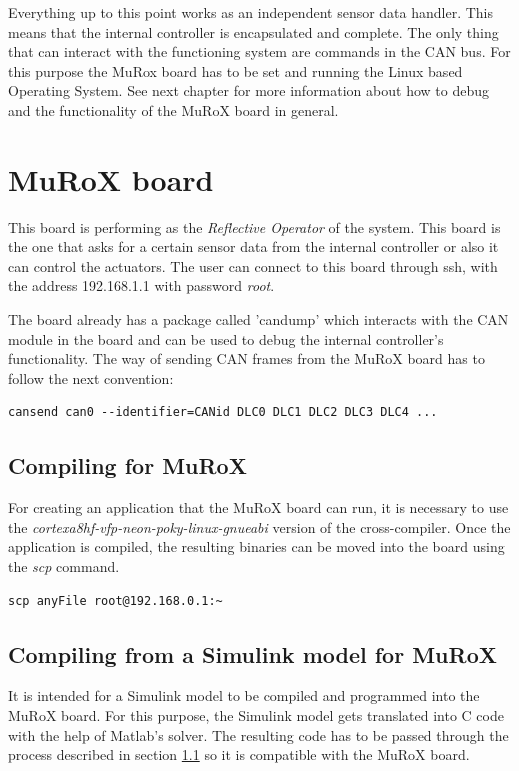 \documentclass[12pt]{report}%
\begin{document}
Everything up to this point works as an independent sensor data handler. This means that the internal controller is encapsulated and complete. The only thing that can interact with the functioning system are commands in the CAN bus. For this purpose the MuRox board has to be set and running the Linux based Operating System. See next chapter for more information about how to debug and the functionality of the MuRoX board in general.

\chapter{MuRoX board}
\label{chap:reflective}
This board is performing as the \textit{Reflective Operator} of the system. This board is the one that asks for a certain sensor data from the internal controller or also it can control the actuators. The user can connect to this board through ssh, with the address 192.168.1.1 with password \textit{root}.

The board already has a package called 'candump' which interacts with the CAN module in the board and can be used to debug the internal controller's functionality. The way of sending CAN frames from the MuRoX board has to follow the next convention:

\begin{lstlisting}[caption = CAN send format, label = CAN:debug, captionpos = b]
cansend can0 --identifier=CANid DLC0 DLC1 DLC2 DLC3 DLC4 ...
\end{lstlisting}

\section{Compiling for MuRoX}
\label{sec:poky}
For creating an application that the MuRoX board can run, it is necessary to use the \textit{cortexa8hf-vfp-neon-poky-linux-gnueabi} version of the cross-compiler. Once the application is compiled, the resulting binaries can be moved into the board using the \textit{scp} command.

\begin{lstlisting}[caption = moving files into MuRoX board \cite{AMiRo_Murox}, label = CAN:debug, captionpos = b]
scp anyFile root@192.168.0.1:~
\end{lstlisting}

\section{Compiling from a Simulink model for MuRoX}
It is intended for a Simulink model to be compiled and programmed into the MuRoX board. For this purpose, the Simulink model gets translated into C code with the help of Matlab's solver. The resulting code has to be passed through the process described in section \ref{sec:poky} so it is compatible with the MuRoX board.
\end{document}
